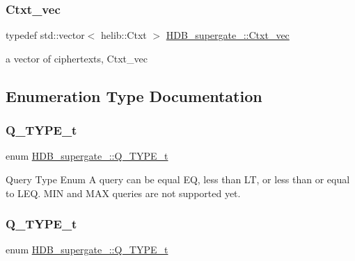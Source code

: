 \subsubsection{\texorpdfstring{Ctxt\+\_\+vec}{Ctxt\_vec}}
{\footnotesize\ttfamily typedef std\+::vector$<$ helib\+::\+Ctxt $>$ \hyperlink{namespaceHDB__supergate___ade0781b5973aae08b689ed72b30511fb}{H\+D\+B\+\_\+supergate\+\_\+\+::\+Ctxt\+\_\+vec}}

a vector of ciphertexts, Ctxt\+\_\+vec 

\subsection{Enumeration Type Documentation}
\mbox{\label{namespaceHDB__supergate___a1d92aed09c83a1692f702cbaa85757e2}} 
\subsubsection{\texorpdfstring{Q\+\_\+\+T\+Y\+P\+E\+\_\+t}{Q\_TYPE\_t}\hspace{0.1cm}{\footnotesize\ttfamily [1/2]}}
{\footnotesize\ttfamily enum \hyperlink{namespaceHDB__supergate___a1d92aed09c83a1692f702cbaa85757e2}{H\+D\+B\+\_\+supergate\+\_\+\+::\+Q\+\_\+\+T\+Y\+P\+E\+\_\+t}}

Query Type Enum A query can be equal EQ, less than LT, or less than or equal to L\+EQ. M\+IN and M\+AX queries are not supported yet. \mbox{\label{namespaceHDB__supergate___a1d92aed09c83a1692f702cbaa85757e2}} 
\subsubsection{\texorpdfstring{Q\+\_\+\+T\+Y\+P\+E\+\_\+t}{Q\_TYPE\_t}\hspace{0.1cm}{\footnotesize\ttfamily [2/2]}}
{\footnotesize\ttfamily enum \hyperlink{namespaceHDB__supergate___a1d92aed09c83a1692f702cbaa85757e2}{H\+D\+B\+\_\+supergate\+\_\+\+::\+Q\+\_\+\+T\+Y\+P\+E\+\_\+t}}

